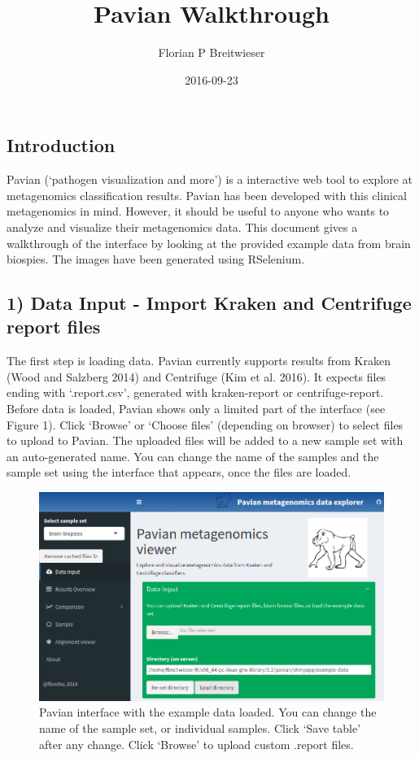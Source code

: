 \documentclass[]{article}
\title{Pavian Walkthrough}
\author{Florian P Breitwieser}
\date{2016-09-23}
\begin{document}
\maketitle

{
\setcounter{tocdepth}{2}
\tableofcontents
}
\subsection{Introduction}\label{introduction}

Pavian (`pathogen visualization and more') is a interactive web tool to
explore at metagenomics classification results. Pavian has been
developed with this clinical metagenomics in mind. However, it should be
useful to anyone who wants to analyze and visualize their metagenomics
data. This document gives a walkthrough of the interface by looking at
the provided example data from brain biospies. The images have been
generated using RSelenium.

\subsection{1) Data Input - Import Kraken and Centrifuge report
files}\label{data-input---import-kraken-and-centrifuge-report-files}

The first step is loading data. Pavian currently supports results from
Kraken (Wood and Salzberg 2014) and Centrifuge (Kim et al. 2016). It
expects files ending with `.report.csv', generated with kraken-report or
centrifuge-report. Before data is loaded, Pavian shows only a limited
part of the interface (see Figure 1). Click `Browse' or `Choose files'
(depending on browser) to select files to upload to Pavian. The uploaded
files will be added to a new sample set with an auto-generated name. You
can change the name of the samples and the sample set using the
interface that appears, once the files are loaded.

\begin{figure}[htbp]
\centering
\includegraphics{load-data-set.png}
\caption{Pavian interface with the example data loaded. You can change
the name of the sample set, or individual samples. Click `Save table'
after any change. Click `Browse' to upload custom .report files.}
\end{figure}
\end{document}
